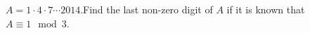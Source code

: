 $A=1\cdot4\cdot7\cdots2014$.Find the last non-zero digit of $A$ if it is known that $A\equiv 1\mod3$.